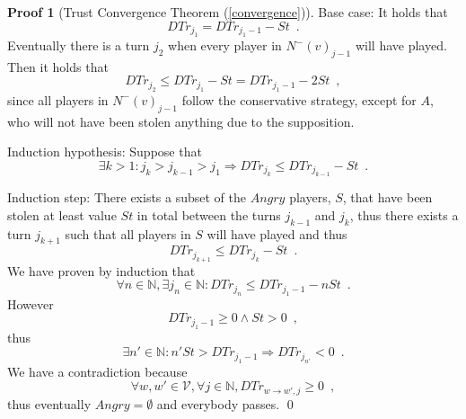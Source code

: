 \documentclass[11pt]{llncs}
\theoremstyle{definition}
\newtheorem{sepproof}{Proof}
\begin{document}
\begin{sepproof}[Trust Convergence Theorem (\ref{convergence})]
       Base case: It holds that
       \begin{equation}
          DTr_{j_1} = DTr_{j_1-1} - St \enspace.
       \end{equation}
       Eventually there is a turn $j_2$ when every player in $N^{-}(v)_{j-1}$ will have played. Then it holds that
       \begin{equation}
          DTr_{j_2} \leq DTr_{j_1} - St = DTr_{j_1-1} - 2St \enspace,
       \end{equation}
       since all players in $N^{-}(v)_{j-1}$ follow the conservative strategy, except for $A$, who will not have been stolen
       anything due to the supposition.

       Induction hypothesis: Suppose that
       \begin{equation}
          \exists k > 1 : j_k > j_{k-1} > j_1 \Rightarrow DTr_{j_k} \leq DTr_{j_{k-1}} - St \enspace.
       \end{equation}

       Induction step: There exists a subset of the $Angry$ players, $S$, that have been stolen at least value $St$ in total
       between the turns $j_{k-1}$ and $j_k$, thus there exists a turn $j_{k+1}$ such that all players in $S$ will have
       played and thus
       \begin{equation}
          DTr_{j_{k+1}} \leq DTr_{j_k} - St \enspace.
       \end{equation}
       We have proven by induction that
       \begin{equation}
          \forall n \in \mathbb{N}, \exists j_n \in \mathbb{N} : DTr_{j_n} \leq DTr_{j_1-1} - nSt \enspace.
       \end{equation}
       However
       \begin{equation}
          DTr_{j_1-1} \geq 0 \wedge St > 0 \enspace,
       \end{equation}
       thus
       \begin{equation}
          \exists n' \in \mathbb{N} : n'St > DTr_{j_1-1} \Rightarrow DTr_{j_{n'}} < 0 \enspace.
       \end{equation}
       We have a contradiction because
       \begin{equation}
          \forall w,w' \in \mathcal{V}, \forall j \in \mathbb{N}, DTr_{w \rightarrow w', j} \geq 0 \enspace,
       \end{equation}
       thus eventually $Angry = \emptyset$ and everybody passes. \qed
    \end{sepproof}
\end{document}
